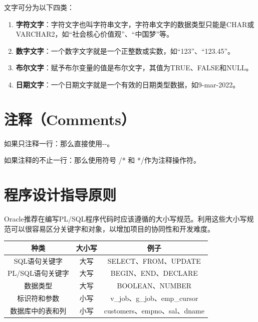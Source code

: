 \documentclass[11pt, a4paper, oneside, UTF8]{ctexbook}
\begin{document}
文字可分为以下四类：
\begin{enumerate}
  \item \textbf{字符文字}：字符文字也叫字符串文字，字符串文字的数据类型只能是CHAR或VARCHAR2，如“社会核心价值观”、“中国梦”等。
  \item \textbf{数字文字}：一个数字文字就是一个正整数或实数，如“123”、“123.45”。
  \item \textbf{布尔文字}：赋予布尔变量的值是布尔文字，其值为TRUE、FALSE和NULL。
  \item \textbf{日期文字}：一个日期文字就是一个有效的日期类型数据，如9-mar-2022。
\end{enumerate}

\section{注释（Comments）}
如果只注释一行：那么直接使用{-}{-}。

如果注释的不止一行：那么使用符号 /* 和 */作为注释操作符。

\section{程序设计指导原则}
Oracle推荐在编写PL/SQL程序代码时应该遵循的大小写规范。利用这些大小写规范可以很容易区分关键字和对象，以增加项目的协同性和开发难度。

\begin{center}
  \begin{minipage}{\textwidth}
    \centering %
    \begin{tabular}{|c|c|c|} %
      \hline %
      \textbf{种类} & \textbf{大小写}  & \textbf{例子} \\
      \hline
      SQL语句关键字 & 大写 & SELECT、FROM、UPDATE \\
      PL/SQL语句关键字 & 大写 & BEGIN、END、DECLARE \\
      数据类型 & 大写 & BOOLEAN、NUMBER \\
      标识符和参数 & 小写 & v\_job、g\_job、emp\_cursor \\
      数据库中的表和列 & 小写 & customers、empno、sal、dname \\
      \hline
    \end{tabular}
    \captionsetup{hypcap=false}
    \label{tab:大小写规范} %
  \end{minipage}
\end{center}
\end{document}

